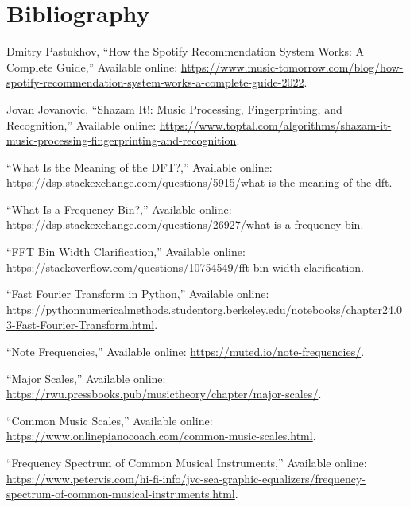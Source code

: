 \documentclass[conference]{IEEEtran}
\begin{document}
                                                      


\section{Bibliography}
\begin{thebibliography}{00}

 Dmitry Pastukhov, ``How the Spotify
  Recommendation System Works: A Complete Guide,'' Available online:
  \url{https://www.music-tomorrow.com/blog/how-spotify-recommendation-system-works-a-complete-guide-2022}.

 Jovan Jovanovic, ``Shazam It!: Music Processing, Fingerprinting, and Recognition,'' Available online: \url{https://www.toptal.com/algorithms/shazam-it-music-processing-fingerprinting-and-recognition}.

 ``What Is the Meaning of the DFT?,'' Available online: \url{https://dsp.stackexchange.com/questions/5915/what-is-the-meaning-of-the-dft}.

 ``What Is a Frequency Bin?,'' Available online: \url{https://dsp.stackexchange.com/questions/26927/what-is-a-frequency-bin}.

 ``FFT Bin Width Clarification,'' Available online: \url{https://stackoverflow.com/questions/10754549/fft-bin-width-clarification}.

 ``Fast Fourier Transform in Python,'' Available online: \url{https://pythonnumericalmethods.studentorg.berkeley.edu/notebooks/chapter24.03-Fast-Fourier-Transform.html}.

 ``Note Frequencies,'' Available online: \url{https://muted.io/note-frequencies/}.

 ``Major Scales,'' Available online: \url{https://rwu.pressbooks.pub/musictheory/chapter/major-scales/}.

 ``Common Music Scales,'' Available online: \url{https://www.onlinepianocoach.com/common-music-scales.html}.

 ``Frequency Spectrum of Common Musical Instruments,'' Available online: \url{https://www.petervis.com/hi-fi-info/jvc-sea-graphic-equalizers/frequency-spectrum-of-common-musical-instruments.html}.

\end{thebibliography}
\end{document}
